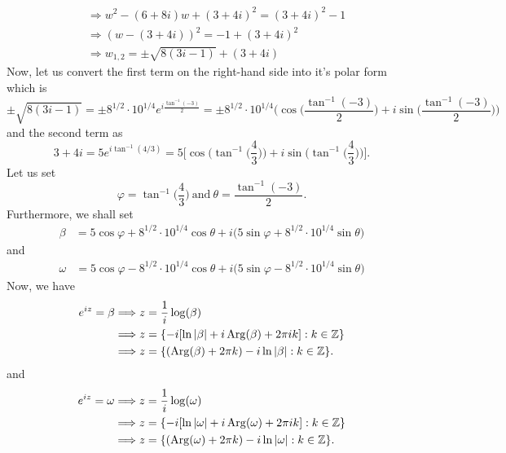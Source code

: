 \documentclass[a4paper]{article}
\begin{document}
\begin{enumerate}
\begin{solution}
\begin{align*}
                                          &\Longrightarrow w^{2} - (6+8i)w + (3+4i)^{2} = (3+4i)^{2} - 1 \\
                                          &\Longrightarrow (w - (3+4i))^{2} = -1 + (3+4i)^{2} \\
                                          &\Longrightarrow w_{1,2} = \pm \sqrt{ 8(3i-1) } + (3+4i)  
        \end{align*}
        Now, let us convert the first term on the right-hand side into it's polar form which is 
        \[ \pm \sqrt{ 8 (3i - 1) } = \pm 8^{1/2} \cdot 10^{1/4} e^{i \frac{ \tan^{-1}(-3) }{ 2 }  } = \pm 8^{1/2} \cdot 10^{1/4} \Big(  \cos \Big(  \frac{ \tan^{-1}(-3) }{ 2 }   \Big) + i \sin \Big(  \frac{ \tan^{-1}(-3) }{ 2 }  \Big) \Big) \]
        and the second term as 
        \[  3 + 4i = 5 e^{i \tan^{-1}(4/3)} = 5 \Big[ \cos \Big(  \tan^{-1} \Big(  \frac{ 4 }{ 3 }  \Big) \Big) + i \sin \Big(  \tan^{-1} \Big(  \frac{ 4 }{ 3 }  \Big) \Big)\Big]. \]
        Let us set
        \[  \varphi = \tan^{-1} \Big(  \frac{ 4 }{ 3 }  \Big) \ \text{and} \ \theta = \frac{ \tan^{-1}(-3) }{ 2 }.  \]
        Furthermore, we shall set 
        \begin{align*}  \beta &=   5 \cos   \varphi  + 8^{1/2}\cdot 10^{1/4} \cos \theta + i \Big(  5 \sin \varphi + 8^{1/2} \cdot 10^{1/4} \sin \theta \Big) \end{align*}
        and
        \begin{align*}  \omega &=   5 \cos   \varphi  - 8^{1/2}\cdot 10^{1/4} \cos \theta + i \Big(  5 \sin \varphi - 8^{1/2} \cdot 10^{1/4} \sin \theta \Big) \end{align*}
        Now, we have
        \begin{align*}
            e^{iz} = \beta &\Longrightarrow z  = \frac{ 1 }{ i }  \log (\beta )  \\
                           &\Longrightarrow z = \{ -i [\ln | \beta  |  + i \operatorname{Arg}(\beta) + 2 \pi i k] : k \in \mathbb{Z}  \} \\  
                           &\Longrightarrow z = \{ (\operatorname{Arg}(\beta) + 2 \pi k)  - i \ln | \beta | : k \in \mathbb{Z}  \}.
        \end{align*}
        and
        \begin{align*}
            e^{iz} = \omega &\Longrightarrow z  = \frac{ 1 }{ i }  \log (\omega )  \\
                           &\Longrightarrow z = \{ -i [\ln | \omega  |  + i \operatorname{Arg}(\omega) + 2 \pi i k ] : k \in \mathbb{Z}  \} \\  
                           &\Longrightarrow z = \{ (\operatorname{Arg}(\omega) + 2 \pi k)  - i \ln | \omega | : k \in \mathbb{Z}  \}.
        \end{align*}
        \end{solution}
\end{enumerate}
\end{document}
